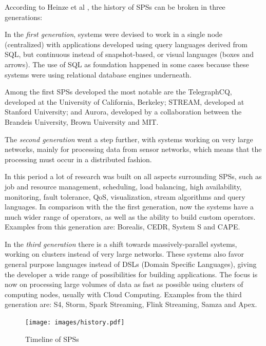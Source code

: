 \documentclass[ppgc,diss,english]{iiufrgs}
\begin{document}

According to Heinze et al \cite{heinze2014cloud}, the history of SPSs can be broken in three generations:

In the \emph{first generation}, systems were devised to work in a single node (centralized) with applications developed using query languages derived from SQL, but continuous instead of snapshot-based, or visual languages (boxes and arrows). The use of SQL as foundation happened in some cases because these systems were using relational database engines underneath.

Among the first SPSs developed the most notable are the TelegraphCQ, developed at the University of California, Berkeley; STREAM, developed at Stanford University; and Aurora, developed by a collaboration between the Brandeis University, Brown University and MIT.

The \emph{second generation} went a step further, with systems working on very large networks, mainly for processing data from sensor networks, which means that the processing must occur in a distributed fashion.

In this period a lot of research was built on all aspects surrounding SPSs, such as job and resource management, scheduling, load balancing, high availability, monitoring, fault tolerance, QoS, visualization, stream algorithms and query languages. In comparison with the the first generation, now the systems have a much wider range of operators, as well as the ability to build custom operators. Examples from this generation are: Borealis, CEDR, System S and CAPE.

In the \emph{third generation} there is a shift towards massively-parallel systems, working on clusters instead of very large networks. These systems also favor general purpose languages instead of DSLs (Domain Specific Languages), giving the developer a wide range of possibilities for building applications. The focus is now on processing large volumes of data as fast as possible using clusters of computing nodes, usually with Cloud Computing. Examples from the third generation are: S4, Storm, Spark Streaming, Flink Streaming, Samza and Apex.

\begin{figure}[!ht]
	\centering
	\texttt{[image: images/history.pdf]}
	\caption[Timeline of SPSs]{Timeline of SPSs \cite{heinze2014cloud}\cite{paulvincent2014}}
	\label{fig:sps_history}
\end{figure}
\end{document}
